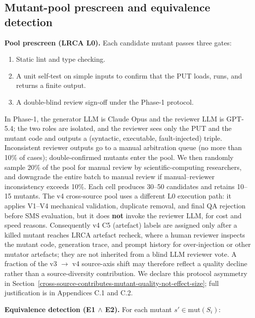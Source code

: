 \documentclass[manuscript,screen,review]{acmart}
\begin{document}
\subsection{Mutant-pool prescreen and equivalence detection}\label{mutant-pool-prescreen-and-equivalence-detection}

\textbf{Pool prescreen (LRCA L0).} Each candidate mutant passes three
gates:
\begin{enumerate}

\item Static lint and type checking.
\item A unit self-test on simple inputs to confirm that the PUT loads,
  runs, and returns a finite output.
\item A double-blind review sign-off under the Phase-1 protocol.
\end{enumerate} In Phase-1, the generator LLM is Claude Opus and the reviewer
LLM is GPT-5.4; the two roles are isolated, and the reviewer sees only
the PUT and the mutant code and outputs a (syntactic, executable,
fault-injected) triple. Inconsistent reviewer outputs go to a manual
arbitration queue (no more than 10\% of cases); double-confirmed mutants
enter the pool. We then randomly sample 20\% of the pool for manual
review by scientific-computing researchers, and downgrade the entire
batch to manual review if manual--reviewer inconsistency exceeds 10\%.
Each cell produces 30--50 candidates and retains 10--15 mutants. The v4
cross-source pool uses a different L0 execution path: it applies V1--V4
mechanical validation, duplicate removal, and final QA rejection before
SMS evaluation, but it does \textbf{not} invoke the reviewer LLM, for
cost and speed reasons. Consequently v4 C5 (artefact) labels are
assigned only after a killed mutant reaches LRCA artefact recheck, where
a human reviewer inspects the mutant code, generation trace, and prompt
history for over-injection or other mutator artefacts; they are not
inherited from a blind LLM reviewer vote. A fraction of the v3 $\to$ v4
source-axis shift may therefore reflect a quality decline rather than a
source-diversity contribution. We declare this protocol asymmetry in
Section~\ref{cross-source-contributes-mutant-quality-not-effect-size};
full justification is in Appendices C.1 and C.2.

\textbf{Equivalence detection (E1 $\wedge$ E2).} For each mutant
$s' \in \mathrm{mut}(S_i)$:
\end{document}
